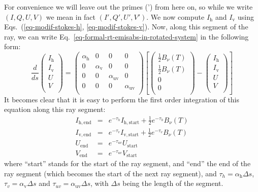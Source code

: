 \documentclass{report}
\begin{document}
For convenience we will leave out the primes (') from here on, so while we
write $(I,Q,U,V)$ we mean in fact $(I',Q',U',V')$. We now compute
$I_{\mathrm{h}}$ and $I_{\mathrm{v}}$ using Eqs.~(\ref{eq-modif-stokes-h},
\ref{eq-modif-stokes-v}). Now, along this segment of the ray, we can write
Eq.~\ref{eq-formal-rt-emisabs-in-rotated-system} in the following form:
\begin{equation}\label{eq-firstorder-int-emisabs}
\frac{d}{ds}
\left(\begin{matrix}
I_{\mathrm{h}} \\
I_{\mathrm{v}} \\
U \\
V \\
\end{matrix}\right)
= 
\left(\begin{matrix}
\alpha_{\mathrm{h}} & 0 & 0 & 0 \\
0 & \alpha_{\mathrm{v}} & 0 & 0  \\
0 & 0 & \alpha_{\mathrm{uv}} & 0 \\
0 & 0 & 0 & \alpha_{\mathrm{uv}} \\
\end{matrix}\right)
\left[
\left(\begin{matrix}
\tfrac{1}{2} B_\nu(T) \\
\tfrac{1}{2} B_\nu(T) \\
0 \\
0 \\
\end{matrix}\right)
- 
\left(\begin{matrix}
I_{\mathrm{h}} \\
I_{\mathrm{v}} \\
U \\
V \\
\end{matrix}\right)\right]
\end{equation}
It becomes clear that it is easy to perform the first order 
integration of this equation along this ray segment:
\begin{eqnarray}
I_{\mathrm{h,end}} &=&  e^{-\tau_h}I_{\mathrm{h,start}} + \tfrac{1}{2}e^{-\tau_h}B_\nu(T)\\
I_{\mathrm{v,end}} &=&  e^{-\tau_v}I_{\mathrm{v,start}} + \tfrac{1}{2}e^{-\tau_v}B_\nu(T) \\
U_{\mathrm{end}} &=&    e^{-\tau_{uv}}U_{\mathrm{start}}\\
V_{\mathrm{end}} &=&    e^{-\tau_{uv}}V_{\mathrm{start}}
\end{eqnarray}
where ``start'' stands for the start of the ray segment, and ``end'' the end
of the ray segment (which becomes the start of the next ray segment), and
$\tau_h=\alpha_{\mathrm{h}}\Delta s$, $\tau_v=\alpha_{\mathrm{v}}\Delta s$
and $\tau_{uv}=\alpha_{\mathrm{uv}}\Delta s$, with $\Delta s$ being the
length of the segment.
\end{document}
